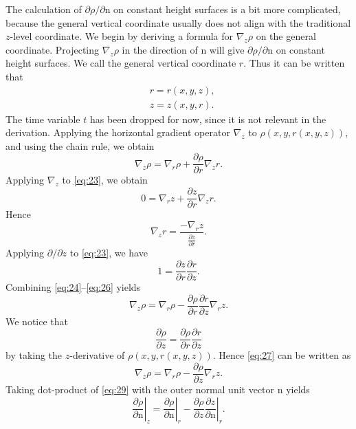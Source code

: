 \documentclass[12pt]{report}
\def\p{\partial}
\def\bs{\boldsymbol}
\def\nb{\bs{\mathrm{n}}}
\begin{document}
The calculation of $\p\rho/\p\mathrm{n}$ on constant height surfaces is 
a bit more complicated, because the general vertical coordinate
usually 
does not align with the traditional $z$-level coordinate. We begin by 
deriving a formula for $\nabla_z\rho$ on the general
coordinate. Projecting $\nabla_z\rho$ in the direction of $\nb$ will
give $\p\rho/\p\mathrm{n}$ on  
constant height surfaces.
We call the general vertical coordinate $r$. Thus it can be written that 
\begin{align}
& r = r(x,y,z),\label{eq:22}\\
& z = z(x,y,r).\label{eq:23}
\end{align}
The time variable $t$ has been dropped for now, since it is not relevant
in the derivation. Applying the horizontal gradient operator $\nabla_z$ 
to $\rho(x,y,r(x,y,z))$, and using the chain rule, we obtain
\begin{equation}
\nabla_z \rho = \nabla_r\rho + \dfrac{\p\rho}{\p r}\nabla_z r.
\label{eq:24}
\end{equation}
Applying $\nabla_z$ to \eqref{eq:23}, we obtain
\begin{equation*}
0 = \nabla_r z + \dfrac{\p z}{\p r}\nabla_z r.
\end{equation*}
Hence
\begin{equation}
\nabla_z r = \frac{-\nabla_r z}{\frac{\p z}{\p r}}.\label{eq:25}
\end{equation}
Applying $\p/\p z$ to \eqref{eq:23}, we have
\begin{equation}
1 = \dfrac{\p z}{\p r}\dfrac{\p r}{\p z}.\label{eq:26}
\end{equation}
Combining \eqref{eq:24}--\eqref{eq:26} yields
\begin{equation}
\nabla_z \rho = \nabla_r \rho - \dfrac{\p \rho}{\p r}
\dfrac{\p r}{\p z}\nabla_r z.\label{eq:27}
\end{equation}
We notice that 
\begin{equation}
\dfrac{\p \rho}{\p z} = \dfrac{\p \rho}{\p r}
\dfrac{\p r}{\p z}\label{eq:28}
\end{equation}
by taking the $z$-derivative of $\rho(x,y,r(x,y,z))$. Hence 
\eqref{eq:27} can be written as
\begin{equation}
\nabla_z \rho = \nabla_r \rho - \dfrac{\p\rho}{\p z}\nabla_r z.
\label{eq:29}
\end{equation}
Taking dot-product of \eqref{eq:29} with the outer normal unit vector
$\nb$ yields
\begin{equation}
\left.\dfrac{\p\rho}{\p \mathrm{n}}\right|_z = 
\left.\dfrac{\p\rho}{\p\mathrm{n}}\right|_r - \left.\dfrac{\p\rho}{\p z}
\dfrac{\p z}{\p\mathrm{n}}\right|_r.
\label{eq:30}
\end{equation}
\end{document}
